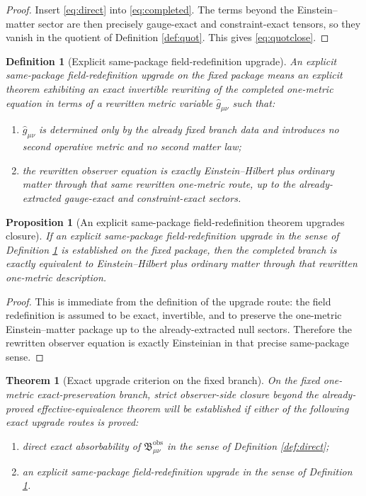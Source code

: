 \documentclass[11pt]{article}
\newcommand{\ObsBurden}{\mathfrak B_{\mu\nu}^{\mathrm{obs}}}
\newcommand{\RedefMetric}{\widehat g}
\newtheorem{definition}{Definition}
\newtheorem{proposition}{Proposition}
\newtheorem{theorem}{Theorem}
\begin{document}
\begin{proof}
Insert \eqref{eq:direct} into \eqref{eq:completed}. The terms beyond the Einstein--matter sector are then precisely gauge-exact and constraint-exact tensors, so they vanish in the quotient of Definition \ref{def:quot}. This gives \eqref{eq:quotclose}.
\end{proof}

\begin{definition}[Explicit same-package field-redefinition upgrade]
\label{def:redef}
An \emph{explicit same-package field-redefinition upgrade} on the fixed package means an explicit theorem exhibiting an exact invertible rewriting of the completed one-metric equation in terms of a rewritten metric variable \(\RedefMetric_{\mu\nu}\) such that:
\begin{enumerate}
    \item \(\RedefMetric_{\mu\nu}\) is determined only by the already fixed branch data and introduces no second operative metric and no second matter law;
    \item the rewritten observer equation is exactly Einstein--Hilbert plus ordinary matter through that same rewritten one-metric route, up to the already-extracted gauge-exact and constraint-exact sectors.
\end{enumerate}
\end{definition}

\begin{proposition}[An explicit same-package field-redefinition theorem upgrades closure]
\label{prop:redef}
If an explicit same-package field-redefinition upgrade in the sense of Definition \ref{def:redef} is established on the fixed package, then the completed branch is exactly equivalent to Einstein--Hilbert plus ordinary matter through that rewritten one-metric description.
\end{proposition}

\begin{proof}
This is immediate from the definition of the upgrade route: the field redefinition is assumed to be exact, invertible, and to preserve the one-metric Einstein--matter package up to the already-extracted null sectors. Therefore the rewritten observer equation is exactly Einsteinian in that precise same-package sense.
\end{proof}

\begin{theorem}[Exact upgrade criterion on the fixed branch]
\label{thm:criterion}
On the fixed one-metric exact-preservation branch, strict observer-side closure beyond the already-proved effective-equivalence theorem will be established if either of the following exact upgrade routes is proved:
\begin{enumerate}
    \item direct exact absorbability of \(\ObsBurden\) in the sense of Definition \ref{def:direct};
    \item an explicit same-package field-redefinition upgrade in the sense of Definition \ref{def:redef}.
\end{enumerate}
\end{theorem}
\end{document}
